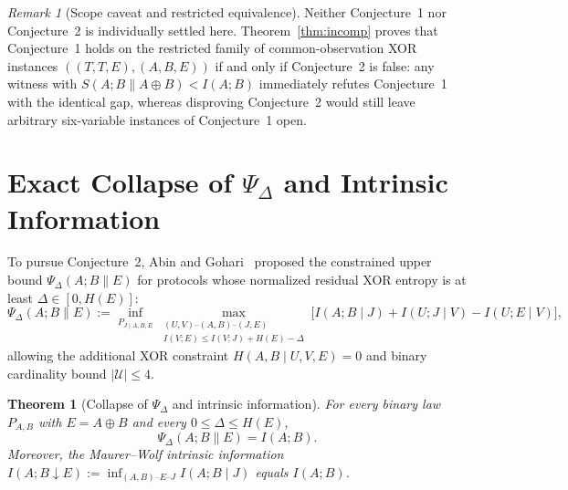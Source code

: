 \documentclass[11pt]{article}
\theoremstyle{plain}
\newtheorem{theorem}{Theorem}
\theoremstyle{definition}
\theoremstyle{remark}
\newtheorem{remark}{Remark}
\newcommand{\mkv}{\text{--}}
\begin{document}
\begin{remark}[Scope caveat and restricted equivalence]
Neither Conjecture~1 nor Conjecture~2 is individually settled here.
Theorem~\ref{thm:incomp} proves that Conjecture~1 holds on the restricted family of common-observation XOR instances $((T, T, E), (A, B, E))$ if and only if Conjecture~2 is false: any witness with $S(A; B \| A \oplus B) < I(A; B)$ immediately refutes Conjecture~1 with the identical gap, whereas disproving Conjecture~2 would still leave arbitrary six-variable instances of Conjecture~1 open.
\end{remark}

\section{Exact Collapse of \texorpdfstring{$\Psi_\Delta$}{Psi\_Delta} and Intrinsic Information}

To pursue Conjecture~2, Abin and Gohari~\cite{AbinGohari2026} proposed the constrained upper bound $\Psi_\Delta(A; B \| E)$ for protocols whose normalized residual XOR entropy is at least $\Delta \in [0, H(E)]$:
\[
\Psi_\Delta(A; B \| E) := \inf_{P_{J \mid A, B, E}} \max_{\substack{(U, V) \mkv (A, B) \mkv (J, E) \\ I(V; E) \le I(V; J) + H(E) - \Delta}} \bigl[I(A; B \mid J) + I(U; J \mid V) - I(U; E \mid V)\bigr],
\]
allowing the additional XOR constraint $H(A, B \mid U, V, E) = 0$ and binary cardinality bound $|\mathcal{U}| \le 4$.

\begin{theorem}[Collapse of $\Psi_\Delta$ and intrinsic information]\label{thm:psi}
For every binary law $P_{A, B}$ with $E = A \oplus B$ and every $0 \le \Delta \le H(E)$,
\begin{equation}\label{eq:psi}
\Psi_\Delta(A; B \| E) = I(A; B).
\end{equation}
Moreover, the Maurer--Wolf intrinsic information $I(A; B \downarrow E) := \inf_{(A, B) \mkv E \mkv J} I(A; B \mid J)$ equals $I(A; B)$.
\end{theorem}
\end{document}
